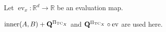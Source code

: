 \documentclass{localbold}
\newcommand{\R}{\mathbb{R}}
\DeclareMathOperator{\ev}{ev}
\begin{document}
Let $\ev_x:\R^d\to\R$ be an evaluation map.

\newcommand{\MidMacro}{\QTC\circ\ev}


$\operatorname{inner}(A,B)+\mathbf{Q}^{\Pi_{\operatorname{TC}_X}}$ and $\MidMacro$ are used here.
\end{document}
